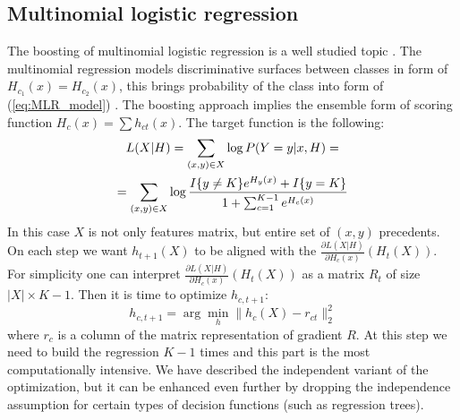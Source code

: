 \documentclass{article}
\begin{document}
\subsection{Multinomial logistic regression}
The boosting of multinomial logistic regression is a well studied topic \cite{Friedman98additivelogistic}. The multinomial regression models discriminative surfaces between classes in form of $H_{c_1}(x)=H_{c_2}(x)$, this brings probability of the class into form of (\ref{eq:MLR_model}) \cite{GLM}. The boosting approach implies the ensemble form of scoring function $H_c(x) = \sum h_{ct}(x)$. The target function is the following:
\begin{multline*}
	L(X\arrowvert H) = \sum_{(x,y) \in X} \log P(Y = y \arrowvert x, H) = \\
	= \sum_{(x,y) \in X} \log \frac{ I\{y \ne K \}e^{H_y(x)} + I\{y=K\} }{ 1+\sum_{c=1}^{K-1} e^{H_c(x)} }
\end{multline*}
In this case $X$ is not only features matrix, but entire set of $(x, y)$ precedents. On each step we want $h_{t + 1}(X)$ to be aligned with the $\frac{\partial L(X|H)}{\partial H_c(x)}(H_t(X))$. For simplicity one can interpret $\frac{\partial L(X|H)}{\partial H_c(x)}(H_t(X))$ as a matrix $R_t$ of size $|X|\times K-1$. Then it is time to optimize $h_{c,t+1}$:
\begin{equation}
h_{c,t+1} = \arg \min_h \|h_c(X) - r_{ct}\|_2^2
\label{eq:MLR_boosting_step}
\end{equation}
where $r_c$ is a column of the matrix representation of gradient $R$. At this step we need to build the regression $K-1$ times and this part is the most computationally intensive. We have described the independent variant of the optimization, but it can be enhanced even further by dropping the independence assumption for certain types of decision functions (such as regression trees).
\end{document}
